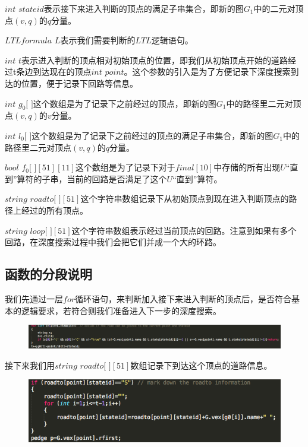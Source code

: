 \documentclass[UTF8]{ctexart}
\begin{document}
$int$ $stateid$表示接下来进入判断的顶点的满足子串集合，即新的图$G_{1}$中的二元对顶点$(v, q)$的$q$分量。

$LTLformula$ $L$表示我们需要判断的$LTL$逻辑语句。

$int$ $t$表示进入判断的顶点相对初始顶点的位置，即我们从初始顶点开始的道路经过t条边到达现在的顶点$int$ $point$。这个参数的引入是为了方便记录下深度搜索到达的位置，便于记录下回路等信息。

$int$ $g_{0}$$[$ $]$这个数组是为了记录下之前经过的顶点，即新的图$G_{1}$中的路径里二元对顶点$(v, q)$的$v$分量。

$int$ $l_{0}$$[$ $]$这个数组是为了记录下之前经过的顶点的满足子串集合，即新的图$G_{1}$中的路径里二元对顶点$(v, q)$的$q$分量。

$bool$ $f_{0}$$[$ $][51][11]$这个数组是为了记录下对于$final[10]$中存储的所有出现$U$“直到”算符的子串，当前的回路是否满足了这个$U$“直到”算符。

$string$ $roadto[$ $][51]$这个字符串数组记录下从初始顶点到现在进入判断顶点的路径上经过的所有顶点。

$string$ $loop[$ $][51]$这个字符串数组表示经过当前顶点的回路。注意到如果有多个回路，在深度搜索过程中我们会把它们并成一个大的环路。

\subsection{函数的分段说明}
我们先通过一层$for$循环语句，来判断加入接下来进入判断的顶点后，是否符合基本的逻辑要求，若符合则我们准备进入下一步的深度搜索。

\begin{figure}[!htb]
\centering
\includegraphics[scale=0.4]{2.png}
\end{figure}

接下来我们用$string$ $roadto[$ $][51]$数组记录下到达这个顶点的道路信息。

\begin{figure}[!htb]
\centering
\includegraphics[scale=0.5]{3.png}
\end{figure}
\end{document}
